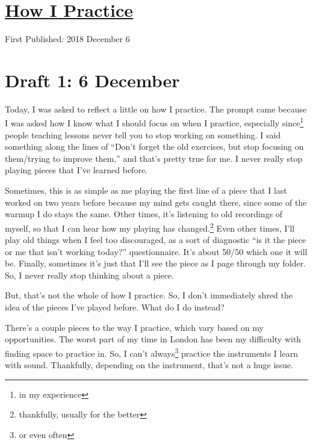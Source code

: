 \documentclass[12pt]{article}[titlepage]
\newcommand{\say}[1]{``#1''}
\newcommand{\1}{\={a}}
\newcommand{\2}{\={e}}
\newcommand{\3}{\={\i}}
\newcommand{\4}{\=o}
\newcommand{\5}{\=u}
\newcommand{\6}{\={A}}
\renewcommand{\,}{\textsuperscript{,}}
\begin{document}
\doublespacing
\section{\href{how-i-practice.html}{How I Practice}}
First Published: 2018 December 6
\section{Draft 1: 6 December}
Today, I was asked to reflect a little on how I practice.
The prompt came because I was asked how I know what I should focus on when I practice, especially since\footnote{in my experience} people teaching lessons never tell you to stop working on something.
I said something along the lines of \say{Don't forget the old exercises, but stop focusing on them/trying to improve them,} and that's pretty true for me.
I never really stop playing pieces that I've learned before.

Sometimes, this is as simple as me playing the first line of a piece that I last worked on two years before because my mind gets caught there, since some of the warmup I do stays the same.
Other times, it's listening to old recordings of myself, so that I can hear how my playing has changed.\footnote{thankfully, usually for the better}
Even other times, I'll play old things when I feel too discouraged, as a sort of diagnostic \say{is it the piece or me that isn't working today?} questionnaire.
It's about 50/50 which one it will be.
Finally, sometimes it's just that I'll see the piece as I page through my folder.
So, I never really stop thinking about a piece.

But, that's not the whole of how I practice.
So, I don't immediately shred the idea of the pieces I've played before.
What do I do instead?

There's a couple pieces to the way I practice, which vary based on my opportunities.
The worst part of my time in London has been my difficulty with finding space to practice in.
So, I can't always\footnote{or even often} practice the instruments I learn with sound.
Thankfully, depending on the instrument, that's not a huge issue.
\end{document}
